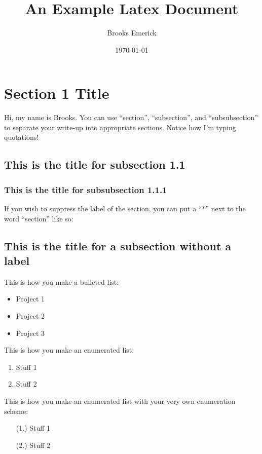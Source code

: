 \documentclass[11pt]{article}
\title{An Example Latex Document}
\author{Brooks Emerick}
\date{\today}
\begin{document}
\maketitle

\section{Section 1 Title}
Hi, my name is Brooks. You can use ``section'', ``subsection'', and ``subsubsection'' to separate your write-up into appropriate sections.  Notice how I'm typing quotations! 

\subsection{This is the title for subsection 1.1}

\subsubsection{This is the title for subsubsection 1.1.1}

If you wish to suppress the label of the section, you can put a ``*'' next to the word ``section'' like so:

\subsection*{This is the title for a subsection without a label}

This is how you make a bulleted list: 

\begin{itemize}
    \item Project 1 
    \item Project 2
    \item Project 3
\end{itemize}

This is how you make an enumerated list:
\begin{enumerate}
    \item Stuff 1
    \item Stuff 2
\end{enumerate}

This is how you make an enumerated list with your very own enumeration scheme: 
\begin{enumerate}
    \item[(1.)] Stuff 1
    \item[(2.)] Stuff 2
\end{enumerate}
\end{document}
